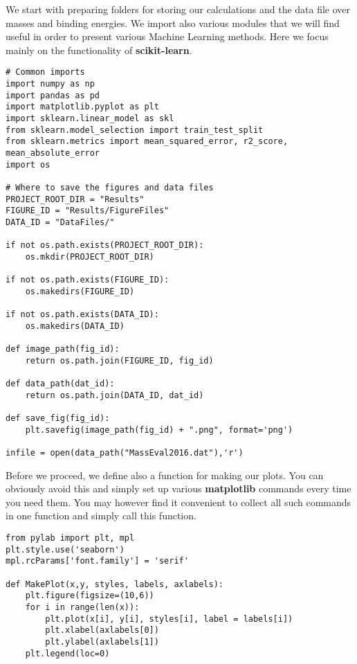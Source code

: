 \documentclass[%
oneside,                 %
final,                   %
10pt]{article}
\begin{document}
We start with preparing folders for storing our calculations and the data file over masses and binding energies. We import also various modules that we will find useful in order to present various Machine Learning methods. Here we focus mainly on the functionality of \textbf{scikit-learn}.
\begin{verbatim}
# Common imports
import numpy as np
import pandas as pd
import matplotlib.pyplot as plt
import sklearn.linear_model as skl
from sklearn.model_selection import train_test_split
from sklearn.metrics import mean_squared_error, r2_score, mean_absolute_error
import os

# Where to save the figures and data files
PROJECT_ROOT_DIR = "Results"
FIGURE_ID = "Results/FigureFiles"
DATA_ID = "DataFiles/"

if not os.path.exists(PROJECT_ROOT_DIR):
    os.mkdir(PROJECT_ROOT_DIR)

if not os.path.exists(FIGURE_ID):
    os.makedirs(FIGURE_ID)

if not os.path.exists(DATA_ID):
    os.makedirs(DATA_ID)

def image_path(fig_id):
    return os.path.join(FIGURE_ID, fig_id)

def data_path(dat_id):
    return os.path.join(DATA_ID, dat_id)

def save_fig(fig_id):
    plt.savefig(image_path(fig_id) + ".png", format='png')

infile = open(data_path("MassEval2016.dat"),'r')
\end{verbatim}


Before we proceed, we define also a function for making our plots. You can obviously avoid this and simply set up various \textbf{matplotlib} commands every time you need them. You may however find it convenient to collect all such commands in one function and simply call this function. 
\begin{verbatim}
from pylab import plt, mpl
plt.style.use('seaborn')
mpl.rcParams['font.family'] = 'serif'

def MakePlot(x,y, styles, labels, axlabels):
    plt.figure(figsize=(10,6))
    for i in range(len(x)):
        plt.plot(x[i], y[i], styles[i], label = labels[i])
        plt.xlabel(axlabels[0])
        plt.ylabel(axlabels[1])
    plt.legend(loc=0)
\end{verbatim}
\end{document}
